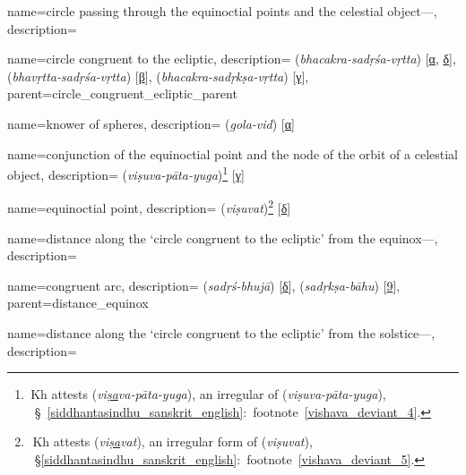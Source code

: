 {
    name={circle passing through the equinoctial points and the celestial object---},
    description={\phantom{x}\nopagebreak}
}

{
        name={circle congruent to the ecliptic},
        description={ (\textit{bhacakra-sadṛśa-vṛtta}) [\hyperlink{SEpassA}{α}, \hyperlink{SEpassD}{δ}],  (\textit{bhavṛtta-sadṛśa-vṛtta}) [\hyperlink{SEpassB}{β}],  (\textit{bhacakra-sadṛkṣa-vṛtta}) [\hyperlink{SEpassC}{γ}]},
        parent={circle_congruent_ecliptic_parent}
}

{
        name={knower of spheres},
        description={ (\textit{gola-vid}) [\hyperlink{SEpassA}{α}]}
}
     

{
        name={conjunction of the equinoctial point and the node of the orbit of a celestial object},
        description={ (\textit{viṣuva-pāta-yuga})\footnote{\,Kh attests  (\textit{vi\underline{ṣa}va-pāta-yuga}), an irregular of  (\textit{viṣuva-pāta-yuga}), \vid\ \S~\ref{siddhantasindhu_sanskrit_english}:~footnote~\ref{vishava_deviant_4}.} [\hyperlink{SEpassC}{γ}]}
}

{
        name={equinoctial point},
        description={ (\textit{viṣuvat})\footnote{\,\,Kh attests  (\textit{vi\underline{ṣa}vat}), an irregular form of  (\textit{viṣuvat}), \vid\ \S\thinspace\ref{siddhantasindhu_sanskrit_english}:~footnote~\ref{vishava_deviant_5}.} [\hyperlink{SEpassD}{δ}]}
}

{
        name={distance along the `circle congruent to the ecliptic' from the equinox---},
        description={\phantom{x}\nopagebreak}
}

{
        name={congruent arc},
        description={ (\textit{sadṛś-bhujā}) [\hyperlink{SEpassD}{δ}],  (\textit{sadṛkṣa-bāhu}) [\hyperlink{SEpass9}{9}]},
        parent={distance_equinox}
}      


{
        name={distance along the `circle congruent to the ecliptic' from the solstice---},
        description={\phantom{x}\nopagebreak}
}


